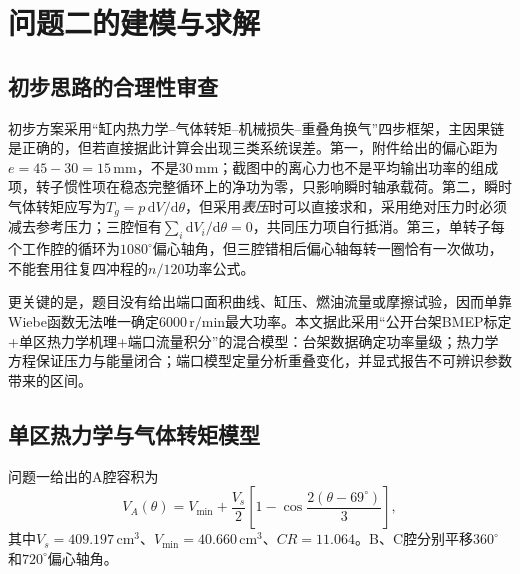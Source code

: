 \section{问题二的建模与求解}

\subsection{初步思路的合理性审查}

初步方案采用``缸内热力学--气体转矩--机械损失--重叠角换气''四步框架，主因果链是正确的，但若直接据此计算会出现三类系统误差。第一，附件给出的偏心距为$e=45-30=15\,\mathrm{mm}$，不是$30\,\mathrm{mm}$；截图中的离心力也不是平均输出功率的组成项，转子惯性项在稳态完整循环上的净功为零，只影响瞬时轴承载荷。第二，瞬时气体转矩应写为$T_g=p\,\mathrm dV/\mathrm d\theta$，但采用\emph{表压}时可以直接求和，采用绝对压力时必须减去参考压力；三腔恒有$\sum_i\mathrm dV_i/\mathrm d\theta=0$，共同压力项自行抵消。第三，单转子每个工作腔的循环为$1080^\circ$偏心轴角，但三腔错相后偏心轴每转一圈恰有一次做功，不能套用往复四冲程的$n/120$功率公式。

更关键的是，题目没有给出端口面积曲线、缸压、燃油流量或摩擦试验，因而单靠Wiebe函数无法唯一确定$6000\,\mathrm{r/min}$最大功率。本文据此采用``公开台架BMEP标定+单区热力学机理+端口流量积分''的混合模型：台架数据确定功率量级；热力学方程保证压力与能量闭合；端口模型定量分析重叠变化，并显式报告不可辨识参数带来的区间。

\subsection{单区热力学与气体转矩模型}

问题一给出的A腔容积为
\begin{equation}
V_A(\theta)=V_{\min}+\frac{V_s}{2}
\left[1-\cos\frac{2(\theta-69^\circ)}{3}\right],
\label{eq:q2_volume}
\end{equation}
其中$V_s=409.197\,\mathrm{cm^3}$、$V_{\min}=40.660\,\mathrm{cm^3}$、$CR=11.064$。B、C腔分别平移$360^\circ$和$720^\circ$偏心轴角。

